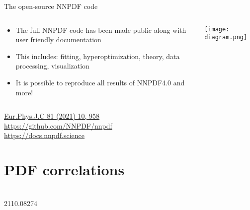\begin{frame}[t]{The open-source NNPDF code}
  \begin{columns}[T]
    \begin{column}{0.48\textwidth}
      \begin{itemize}
        \item The full NNPDF code has been made public along with user friendly documentation
        \item This includes: fitting, hyperoptimization, theory, data processing, visualization
        \item It is possible to reproduce all results of NNPDF4.0 and more!
      \end{itemize}
    \end{column}
    \begin{column}{0.48\textwidth}
      \centering
      \texttt{[image: diagram.png]}
    \end{column}
  \end{columns}
    \begin{block}{}
        \centering
    \href{https://link.springer.com/article/10.1140/epjc/s10052-021-09747-9}{Eur.Phys.J.C 81 (2021) 10, 958} \\
    \url{https://github.com/NNPDF/nnpdf} \\
    \url{https://docs.nnpdf.science}
    \end{block}
\end{frame}



{
\AtBeginSection{}
\section{PDF correlations}
\begin{frame}
  \begin{center}
    \\
    \vspace*{0.3cm} {\small 2110.08274}
  \end{center}
\end{frame}
}

